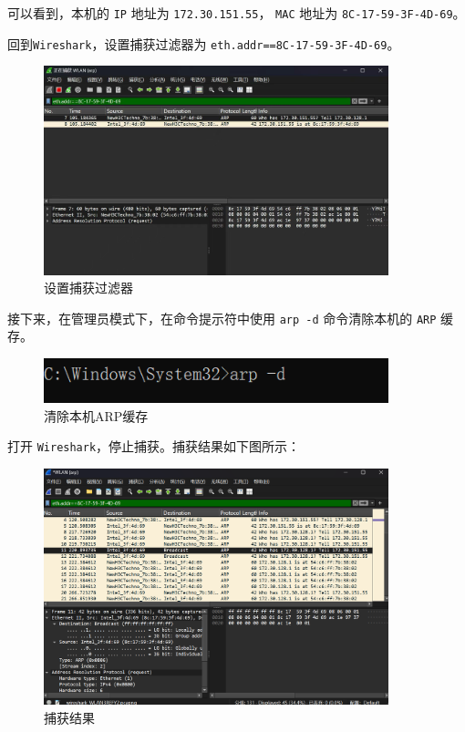 \documentclass{article}
\begin{document}
	可以看到，本机的 \texttt{IP} 地址为 \texttt{172.30.151.55}， \texttt{MAC} 地址为 \texttt{8C-17-59-3F-4D-69}。
	
	回到\texttt{Wireshark}，设置捕获过滤器为 \texttt{eth.addr==8C-17-59-3F-4D-69}。
	
	\begin{figure}[H]
		\centering
		\includegraphics[width=10cm]{images/3.设置捕获过滤器.jpg}
		\caption{设置捕获过滤器}
	\end{figure}
	
	接下来，在管理员模式下，在命令提示符中使用 \texttt{arp -d} 命令清除本机的 \texttt{ARP} 缓存。
	
	\begin{figure}[H]
		\centering
		\includegraphics[width=10cm]{images/4.清除本机ARP缓存.png}
		\caption{清除本机ARP缓存}
	\end{figure}
	
	打开 \texttt{Wireshark}，停止捕获。捕获结果如下图所示：
	
	\begin{figure}[H]
		\centering
		\includegraphics[width=10cm]{images/5.捕获结果.png}
		\caption{捕获结果}
	\end{figure}
	
\end{document}
